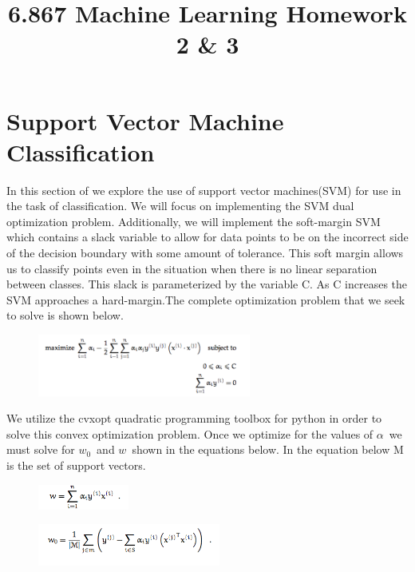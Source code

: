 \documentclass[pageno]{jpaper}
\begin{document}
\title{6.867 Machine Learning Homework 2 \& 3}
\date{}
\maketitle

\thispagestyle{empty}


\section{Support Vector Machine Classification}
In this section of we explore the use of support vector machines(SVM) for use in the task of classification. We will focus on implementing the SVM dual optimization problem. Additionally, we will implement the soft-margin SVM which contains a slack variable to allow for data points to be on the incorrect side of the decision boundary with some amount of tolerance. This soft margin allows us to classify points even in the situation when there is no linear separation between classes. This slack is parameterized by the variable C. As C increases the SVM approaches a hard-margin.The complete optimization problem that we seek to solve is shown below.
\begin{figure}[ht!]
\centering
\includegraphics[width=70mm]{svm_dual_soft}
\end{figure}

We utilize the cvxopt quadratic programming toolbox for python in order to solve this convex optimization problem.
Once we optimize for the values of $\alpha$\ we must solve for $w_0$\ and $w$\, shown in the equations below. In the equation below M is the set of support vectors.

\begin{figure}[ht!]
\centering
\includegraphics[width=30mm]{w}
\end{figure}

\begin{figure}[ht!]
\centering
\includegraphics[width=60mm]{W_0}
\end{figure}
\end{document}
